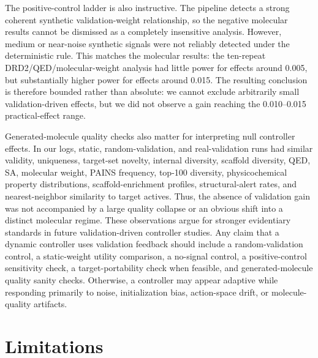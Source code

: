 \documentclass[referee,lineno,pdflatex,sn-basic]{sn-jnl}
\theoremstyle{thmstyleone}%
\theoremstyle{thmstyletwo}%
\theoremstyle{thmstylethree}%
\begin{document}
The positive-control ladder is also instructive. The pipeline detects a strong coherent synthetic validation-weight relationship, so the negative molecular results cannot be dismissed as a completely insensitive analysis. However, medium or near-noise synthetic signals were not reliably detected under the deterministic rule. This matches the molecular results: the ten-repeat DRD2/QED/molecular-weight analysis had little power for effects around 0.005, but substantially higher power for effects around 0.015. The resulting conclusion is therefore bounded rather than absolute: we cannot exclude arbitrarily small validation-driven effects, but we did not observe a gain reaching the 0.010--0.015 practical-effect range.

Generated-molecule quality checks also matter for interpreting null controller effects. In our logs, static, random-validation, and real-validation runs had similar validity, uniqueness, target-set novelty, internal diversity, scaffold diversity, QED, SA, molecular weight, PAINS frequency, top-100 diversity, physicochemical property distributions, scaffold-enrichment profiles, structural-alert rates, and nearest-neighbor similarity to target actives. Thus, the absence of validation gain was not accompanied by a large quality collapse or an obvious shift into a distinct molecular regime. These observations argue for stronger evidentiary standards in future validation-driven controller studies. Any claim that a dynamic controller uses validation feedback should include a random-validation control, a static-weight utility comparison, a no-signal control, a positive-control sensitivity check, a target-portability check when feasible, and generated-molecule quality sanity checks. Otherwise, a controller may appear adaptive while responding primarily to noise, initialization bias, action-space drift, or molecule-quality artifacts.

\section{Limitations}\label{sec:limitations}
\end{document}
